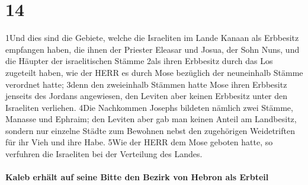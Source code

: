 \hypertarget{section-13}{%
\section{14}\label{section-13}}

1Und dies sind die Gebiete, welche die Israeliten im Lande Kanaan als
Erbbesitz empfangen haben, die ihnen der Priester Eleasar und Josua, der
Sohn Nuns, und die Häupter der israelitischen Stämme 2als ihren
Erbbesitz durch das Los zugeteilt haben, wie der HERR es durch Mose
bezüglich der neuneinhalb Stämme verordnet hatte; 3denn den zweieinhalb
Stämmen hatte Mose ihren Erbbesitz jenseits des Jordans angewiesen, den
Leviten aber keinen Erbbesitz unter den Israeliten verliehen. 4Die
Nachkommen Josephs bildeten nämlich zwei Stämme, Manasse und Ephraim;
den Leviten aber gab man keinen Anteil am Landbesitz, sondern nur
einzelne Städte zum Bewohnen nebst den zugehörigen Weidetriften für ihr
Vieh und ihre Habe. 5Wie der HERR dem Mose geboten hatte, so verfuhren
die Israeliten bei der Verteilung des Landes.

\hypertarget{kaleb-erhuxe4lt-auf-seine-bitte-den-bezirk-von-hebron-als-erbteil}{%
\paragraph{Kaleb erhält auf seine Bitte den Bezirk von Hebron als
Erbteil}\label{kaleb-erhuxe4lt-auf-seine-bitte-den-bezirk-von-hebron-als-erbteil}}

